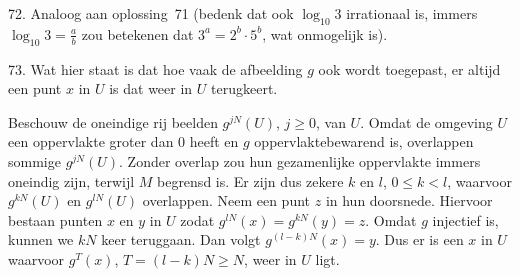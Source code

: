\begin{problem}{72.}
	Analoog aan oplossing~71 (bedenk dat ook $\log_{10} 3$ irrationaal is, immers $\log_{10} 3 = \frac{a}{b}$ zou betekenen dat $3^a = 2^b \cdot 5^b$, wat onmogelijk is).
\end{problem}

\clearpage

\begin{problem}{73.}
    Wat hier staat is dat hoe vaak de afbeelding $g$ ook wordt toe\-gepast, er altijd een punt $x$ in $U$ is dat weer in $U$ terugkeert.

    Beschouw de oneindige rij beelden $g^{j N}(U)$, $j \geq 0$, van $U$. Omdat de omgeving $U$ een oppervlakte groter dan 0 heeft en $g$ oppervlakte\-bewarend is, overlappen sommige $g^{j N}(U)$. Zonder overlap zou hun gezamenlijke oppervlakte immers oneindig zijn, terwijl $M$ begrensd is. Er zijn dus zekere $k$ en $l$, $0 \leq k < l$, waarvoor $g^{k N}(U)$ en $g^{l N}(U)$ overlappen. Neem een punt $z$ in hun doorsnede. Hiervoor bestaan punten $x$ en $y$ in $U$ zodat $g^{l N}(x) = g^{k N}(y) = z$. Omdat $g$ injectief is, kunnen we $k N$ keer teruggaan. Dan volgt $g^{(l - k) N}(x) = y$. Dus er is een $x$ in $U$ waarvoor $g^T(x)$, $T = (l - k) N \geq N$, weer in $U$ ligt.
\end{problem}

